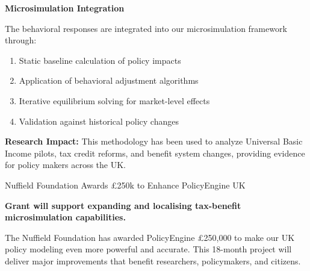 \documentclass[a4paper,11pt]{article}
\newcommand{\highlightbox}[1]{%
    \begin{tcolorbox}[
        colback=lightblue,
        colframe=darkblue,
        leftrule=4mm,
        rightrule=0mm,
        toprule=0mm,
        bottomrule=0mm,
        sharp corners
    ]
    #1
    \end{tcolorbox}
}
\begin{document}
\vspace{15pt}

\begin{tcolorbox}[
    colback=lightgray,
    colframe=mediumblue,
    rounded corners,
    leftrule=3mm,
    rightrule=0mm,
    toprule=0mm,
    bottomrule=0mm
]
\textbf{\color{darkblue}Microsimulation Integration}

The behavioral responses are integrated into our microsimulation framework through:

\begin{enumerate}[leftmargin=15pt]
\item Static baseline calculation of policy impacts
\item Application of behavioral adjustment algorithms
\item Iterative equilibrium solving for market-level effects
\item Validation against historical policy changes
\end{enumerate}
\end{tcolorbox}

\vspace{15pt}

\highlightbox{
\textbf{Research Impact:} This methodology has been used to analyze Universal Basic Income pilots, tax credit reforms, and benefit system changes, providing evidence for policy makers across the UK.
}

\newpage

\begin{tcolorbox}[
    colback=darkblue,
    colframe=darkblue,
    rounded corners,
    fontupper=\color{white}\Large\bfseries
]
Nuffield Foundation Awards £250k to Enhance PolicyEngine UK
\end{tcolorbox}

\vspace{15pt}


\vspace{20pt}

\begin{tcolorbox}[
    colback=darkblue,
    colframe=darkblue,
    rounded corners,
    fontupper=\color{white}\large
]
\textbf{Grant will support expanding and localising tax-benefit microsimulation capabilities.}
\end{tcolorbox}

\vspace{20pt}

The Nuffield Foundation has awarded PolicyEngine £250,000 to make our UK policy modeling even more powerful and accurate. This 18-month project will deliver major improvements that benefit researchers, policymakers, and citizens.
\end{document}
